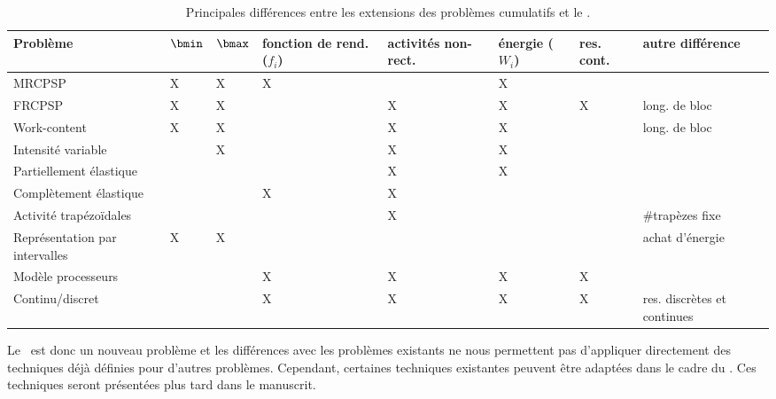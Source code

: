 \begin{table}[!htb]
  \centering
  \begin{tabular}{|>{\centering\arraybackslash} m{2.5cm}|>{\centering\arraybackslash} m{0.8cm}>{\centering\arraybackslash} m{0.8cm}>{\centering\arraybackslash} m{1.9cm}>{\centering\arraybackslash} m{1.5cm}>{\centering\arraybackslash} m{1.3cm}>{\centering\arraybackslash} m{1.2cm}>{\centering\arraybackslash} m{2.4cm}|}
    \hline    
    Problème & $\bmin$ & $\bmax$ & fonction de rend. ($f_i$) &
                                                                   activités
                                                                   non-rect.
    & 
                                                                 énergie
                                                                   ($W_i$)
    & res. cont. & autre différence \\
\hline
MRCPSP \cite{DDH} & X & X & X &    & X &  & \\
\hline
 FRCPSP \cite{NK} & X & X &    & X & X & X & long. de bloc\\  
\hline
Work-content \cite{FT} & X & X & & X & X &  & long. de bloc\\  
\hline
Intensité variable \cite{Kis} &  & X&  & X & X & & \\   
\hline
Partiellement élastique \cite{BLPN} & & & & X & X & &\\
\hline
Complètement élastique \cite{BLPN} & & & X & X & & &\\
\hline
Activité trapézoïdales \cite{BP} & & & & X & & &\#trapèzes fixe\\
\hline
Représentation par intervalles \cite{V09} & X & X & & & & & achat
                                                            d'énergie\\  
\hline
Modèle processeurs \cite{Blaz} & &  & X& X& X& X& \\ 
\hline
Continu/discret \cite{Wali}&  & &X &X & X& X& res. discrètes et continues\\ 
\hline
  \end{tabular}
  \caption{Principales différences entre les extensions des problèmes
    cumulatifs et le \CECSP.}
  \label{tab:dif_CECSP}
\end{table}

Le \CECSP~est donc un nouveau problème et les différences avec les
problèmes existants ne nous permettent pas d'appliquer directement des
techniques déjà définies pour d'autres problèmes. Cependant, certaines
techniques existantes peuvent être adaptées dans le cadre du
\CECSP. Ces techniques seront présentées plus tard dans le manuscrit.

